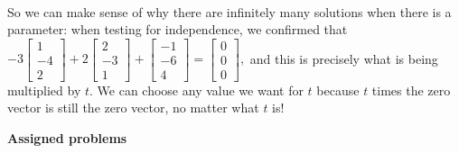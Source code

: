 \documentclass[12pt]{article}
\newcommand{\bbm}{\begin{bmatrix}}
\newcommand{\ebm}{\end{bmatrix}}
\begin{document}
\begin{enumerate}
\begin{align*}
\end{align*}
So we can make sense of why there are infinitely many solutions when there is a parameter: when testing for independence, we confirmed that 
$
-3\bbm 1\\-4\\2\ebm+2 \bbm 2\\-3\\1\ebm+ \bbm -1\\-6\\4\ebm = \bbm 0\\0\\0\ebm,
$
and this is precisely what is being multiplied by $t$. We can choose any value we want for $t$ because $t$ times the zero vector is still the zero vector, no matter what $t$ is!
\end{enumerate}


\newpage

\textbf{Assigned problems}
\end{document}
